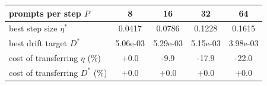 \begin{tabular}{lcccc}
\toprule
prompts per step $P$ & 8 & 16 & 32 & 64 \\
\midrule
best step size $\eta^{*}$ & 0.0417 & 0.0786 & 0.1228 & 0.1615 \\
best drift target $D^{*}$ & 5.06e-03 & 5.29e-03 & 5.15e-03 & 3.98e-03 \\
cost of transferring $\eta$ (\%) & +0.0 & -9.9 & -17.9 & -22.0 \\
cost of transferring $D^{*}$ (\%) & +0.0 & +0.0 & +0.0 & +0.0 \\
\bottomrule
\end{tabular}